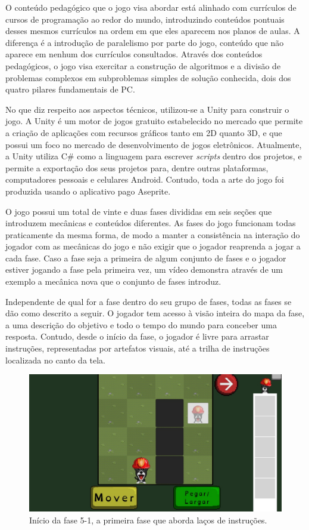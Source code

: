 \documentclass[conference]{IEEEtran}
\begin{document}
O conteúdo pedagógico que o jogo visa abordar está alinhado com currículos de cursos de programação ao redor do mundo\cite{b8}\cite{b20}, introduzindo conteúdos pontuais desses mesmos currículos na ordem em que eles aparecem nos planos de aulas. A diferença é a introdução de paralelismo por parte do jogo, conteúdo que não aparece em nenhum dos currículos consultados. Através dos conteúdos pedagógicos, o jogo visa exercitar a construção de algoritmos e a divisão de problemas complexos em subproblemas simples de solução conhecida, dois dos quatro pilares fundamentais de PC\cite{b6}.

No que diz respeito aos aspectos técnicos, utilizou-se a Unity\cite{b21} para construir o jogo. A Unity é um motor de jogos gratuito estabelecido no mercado que permite a criação de aplicações com recursos gráficos tanto em 2D quanto 3D, e que possui um foco no mercado de desenvolvimento de jogos eletrônicos. Atualmente, a Unity utiliza C\#\cite{b22} como a linguagem para escrever \textit{scripts} dentro dos projetos, e permite a exportação dos seus projetos para, dentre outras plataformas, computadores pessoais e celulares Android. Contudo, toda a arte do jogo foi produzida usando o aplicativo pago Aseprite\cite{b23}.

O jogo possui um total de vinte e duas fases divididas em seis seções que introduzem mecânicas e conteúdos diferentes. As fases do jogo funcionam todas praticamente da mesma forma, de modo a manter a consistência na interação do jogador com as mecânicas do jogo e não exigir que o jogador reaprenda a jogar a cada fase. Caso a fase seja a primeira de algum conjunto de fases e o jogador estiver jogando a fase pela primeira vez, um vídeo demonstra através de um exemplo a mecânica nova que o conjunto de fases introduz.

Independente de qual for a fase dentro do seu grupo de fases, todas as fases se dão como descrito a seguir. O jogador tem acesso à visão inteira do mapa da fase, a uma descrição do objetivo e todo o tempo do mundo para conceber uma resposta. Contudo, desde o início da fase, o jogador é livre para arrastar instruções, representadas por artefatos visuais, até a trilha de instruções localizada no canto da tela.

\begin{figure}[htbp]
\centerline{\includegraphics[scale=0.275]{images/fig01.jpg}}
\caption{Início da fase 5-1, a primeira fase que aborda laços de instruções.}
\label{fig}
\end{figure}
\end{document}
